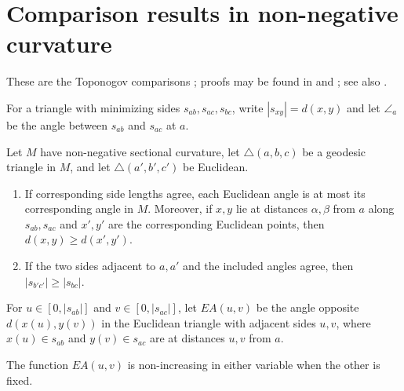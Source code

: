 \section{Comparison results in non-negative curvature}
\label{eqngradvanish}
\label{eqnradial}
\label{locallabel}
\label{eq:tangential-acceleration}
\label{eq:first-variation-energy}
\label{eq:laplacian-frame-sum}
\label{eq:dual-metric-compat}

These are the Toponogov comparisons \cite{Toponogov}; proofs may be
found in \cite{Sakai} and \cite{CheegerEbin}; see also \cite{Petersen}.

For a triangle with minimizing sides $s_{ab},s_{ac},s_{bc}$, write
$|s_{xy}|=d(x,y)$ and let $\angle_a$ be the angle between $s_{ab}$ and
$s_{ac}$ at $a$.

\begin{theorem}
\label{thm:length-comparison}
\label{lengthcompar}

Let $M$ have non-negative sectional curvature, let
$\triangle(a,b,c)$ be a geodesic triangle in $M$, and let
$\triangle(a',b',c')$ be Euclidean.
\begin{enumerate}
\item If corresponding side lengths agree, each Euclidean angle is at
most its corresponding angle in $M$. Moreover, if $x,y$ lie at distances
$\alpha,\beta$ from $a$ along $s_{ab},s_{ac}$ and $x',y'$ are the
corresponding Euclidean points, then $d(x,y)\ge d(x',y')$.
\item If the two sides adjacent to $a,a'$ and the included angles agree,
then $|s_{b'c'}|\ge|s_{bc}|$.
\end{enumerate}
\end{theorem}

For $u\in[0,|s_{ab}|]$ and $v\in[0,|s_{ac}|]$, let $EA(u,v)$ be the
angle opposite $d(x(u),y(v))$ in the Euclidean triangle with adjacent
sides $u,v$, where $x(u)\in s_{ab}$ and $y(v)\in s_{ac}$ are at
distances $u,v$ from $a$.

\begin{corollary}
\label{cor:angle-monotonicity}
\label{anglemono}

The function $EA(u,v)$ is non-increasing in either variable when the
other is fixed.
\end{corollary}

